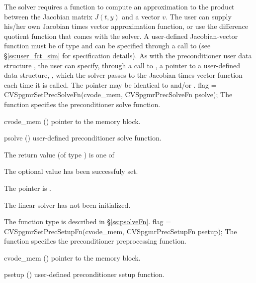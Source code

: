 The 
{\cvspgmr} solver requires a function to compute an approximation to the
product between the Jacobian matrix $J(t,y)$ and a vector $v$.
The user can supply his/her own Jacobian times vector approximation function, 
or use the difference quotient function  
that comes with the {\cvspgmr} solver.
A user-defined Jacobian-vector function must be of type  and 
can be specified through a call to  
(see \S\ref{ss:user_fct_sim} for specification details).
As with the preconditioner user data structure , 
the user can specify, through a call to , a pointer to a 
user-defined data structure, , which
the {\cvspgmr} solver passes to the Jacobian times vector function  each
time it is called.  
The pointer  may be identical to  and/or .
{
  flag = CVSpgmrSetPrecSolveFn(cvode\_mem, CVSpgmrPrecSolveFn psolve);
}
{
  The function  specifies the preconditioner
  solve function.
}
{
  \begin{args}
  \item[cvode\_mem] ()
    pointer to the {\cvode} memory block.
  \item[psolve] ()
    user-defined preconditioner solve function.
  \end{args}
}
{
  The return value  (of type ) is one of
  \begin{args}
  \item[\Id{SUCCESS}] 
    The optional value has been successfuly set.
  \item[\Id{LIN\_NO\_MEM}]
    The  pointer is .
  \item[\Id{LIN\_NO\_LMEM}]
    The {\cvspgmr} linear solver has not been initialized.
  \end{args}
}
{
   The function type  is described in \S\ref{ss:psolveFn}.
}
{
  flag = CVSpgmrSetPrecSetupFn(cvode\_mem, CVSpgmrPrecSetupFn psetup);
}
{
  The function  specifies the preconditioner
  preprocessing function.
}
{
  \begin{args}
  \item[cvode\_mem] ()
    pointer to the {\cvode} memory block.
  \item[psetup] ()
    user-defined preconditioner setup function.
  \end{args}
}
